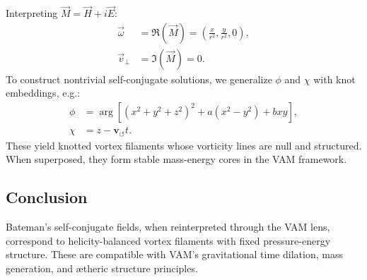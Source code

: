 Interpreting $\vec{M} = \vec{H} + i\vec{E}$:
\begin{align*}
    \vec{\omega} &= \Re(\vec{M}) = \left(\frac{x}{r^2}, \frac{y}{r^2}, 0\right), \\
    \vec{v}_\perp &= \Im(\vec{M}) = 0.
\end{align*}
To construct nontrivial self-conjugate solutions, we generalize $\phi$ and $\chi$ with knot embeddings, e.g.:\cite{faddeev1997stable, arrayas2017knots}
\begin{align}
    \phi &= \arg[(x^2 + y^2 + z^2)^2 + a(x^2 - y^2) + bxy], \\
    \chi &= z - \mathbf{v}_{\scriptscriptstyle\boldsymbol{\circlearrowleft}} t.
\end{align}
These yield knotted vortex filaments whose vorticity lines are null and structured. When superposed, they form stable mass-energy cores in the VAM framework.

\subsection*{Conclusion}

Bateman's self-conjugate fields, when reinterpreted through the VAM lens, correspond to helicity-balanced vortex filaments with fixed pressure-energy structure. These are compatible with VAM's gravitational time dilation, mass generation, and ætheric structure principles.